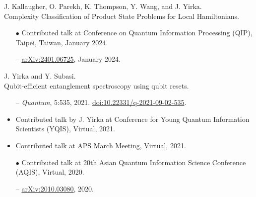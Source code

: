 \documentclass[11pt,letterpaper,serif]{moderncv}
\newcommand{\pubItemSep}{0em}
\begin{document}
J. Kallaugher, O. Parekh, K. Thompson, Y. Wang, and J. Yirka.
\\Complexity Classification of Product State Problems for Local Hamiltonians.
\begin{adjustwidth}{.1in}{}
	\begin{itemize}[itemsep=\pubItemSep]
		\item[$\bullet$] Contributed talk at Conference on Quantum Information Processing (QIP), Taipei, Taiwan, January 2024.
		\item[--] \href{https://arxiv.org/abs/2401.06725}{arXiv:2401.06725}, January 2024.
	\end{itemize}
\end{adjustwidth}
\vspace{\parsep}

J. Yirka and Y. Subasi.
\\Qubit-efficient entanglement spectroscopy using qubit resets.
\begin{adjustwidth}{.1in}{}
	\begin{itemize}[itemsep=\pubItemSep]
		\item[--] \textit{Quantum}, 5:535, 2021. \quad
		\href{https://doi.org/10.22331/q-2021-09-02-535}{doi:10.22331/q-2021-09-02-535}.
		\item Contributed talk by J. Yirka at Conference for Young Quantum Information Scientists (YQIS), Virtual, 2021.
		\item Contributed talk at APS March Meeting, Virtual, 2021.
		\item[$\bullet$] Contributed talk at 20th Asian Quantum Information Science Conference (AQIS), Virtual, 2020.
		\item[--] \href{https://arxiv.org/abs/2010.03080}{arXiv:2010.03080}, 2020.
	\end{itemize}
\end{adjustwidth}
\vspace{\parsep}
\end{document}
